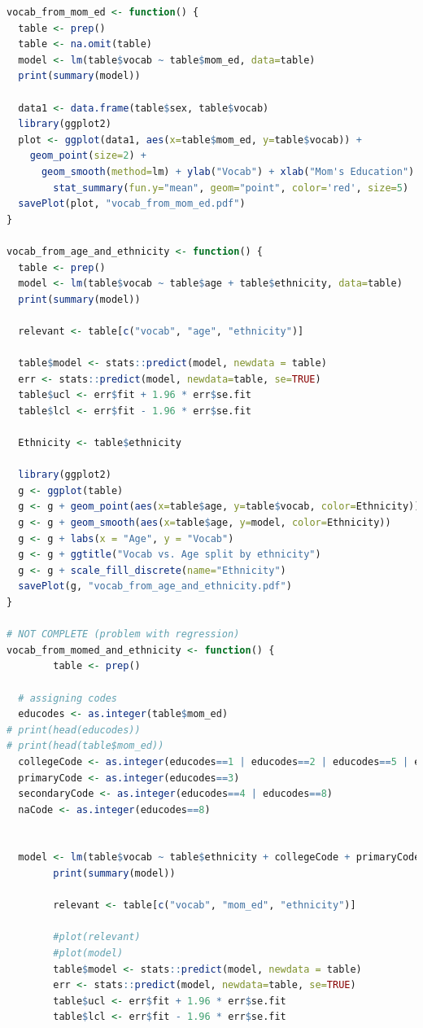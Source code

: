 \documentclass{article}
\begin{document}
\begin{lstlisting}[language=R]
vocab_from_mom_ed <- function() {
  table <- prep()
  table <- na.omit(table)
  model <- lm(table$vocab ~ table$mom_ed, data=table)
  print(summary(model))

  data1 <- data.frame(table$sex, table$vocab)
  library(ggplot2)
  plot <- ggplot(data1, aes(x=table$mom_ed, y=table$vocab)) + 
    geom_point(size=2) + 
      geom_smooth(method=lm) + ylab("Vocab") + xlab("Mom's Education") + 
        stat_summary(fun.y="mean", geom="point", color='red', size=5)
  savePlot(plot, "vocab_from_mom_ed.pdf")
}

vocab_from_age_and_ethnicity <- function() {
  table <- prep()
  model <- lm(table$vocab ~ table$age + table$ethnicity, data=table)
  print(summary(model))

  relevant <- table[c("vocab", "age", "ethnicity")]
  
  table$model <- stats::predict(model, newdata = table)
  err <- stats::predict(model, newdata=table, se=TRUE)
  table$ucl <- err$fit + 1.96 * err$se.fit
  table$lcl <- err$fit - 1.96 * err$se.fit
  
  Ethnicity <- table$ethnicity

  library(ggplot2)
  g <- ggplot(table)
  g <- g + geom_point(aes(x=table$age, y=table$vocab, color=Ethnicity))
  g <- g + geom_smooth(aes(x=table$age, y=model, color=Ethnicity))
  g <- g + labs(x = "Age", y = "Vocab")
  g <- g + ggtitle("Vocab vs. Age split by ethnicity")
  g <- g + scale_fill_discrete(name="Ethnicity")  
  savePlot(g, "vocab_from_age_and_ethnicity.pdf")
}

# NOT COMPLETE (problem with regression) 
vocab_from_momed_and_ethnicity <- function() {
        table <- prep()

  # assigning codes
  educodes <- as.integer(table$mom_ed)  
# print(head(educodes))
# print(head(table$mom_ed))
  collegeCode <- as.integer(educodes==1 | educodes==2 | educodes==5 | educodes==6)
  primaryCode <- as.integer(educodes==3)
  secondaryCode <- as.integer(educodes==4 | educodes==8)
  naCode <- as.integer(educodes==8)
        

  model <- lm(table$vocab ~ table$ethnicity + collegeCode + primaryCode + secondaryCode + naCode, data=table)
        print(summary(model))

        relevant <- table[c("vocab", "mom_ed", "ethnicity")]

        #plot(relevant)
        #plot(model)
        table$model <- stats::predict(model, newdata = table)
        err <- stats::predict(model, newdata=table, se=TRUE)
        table$ucl <- err$fit + 1.96 * err$se.fit
        table$lcl <- err$fit - 1.96 * err$se.fit


\end{lstlisting}
\end{document}
